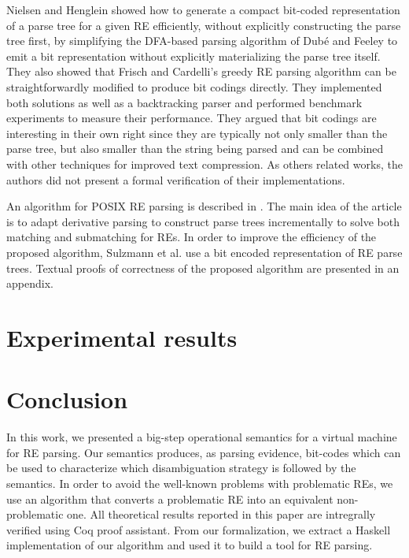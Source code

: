 Nielsen and Henglein \cite{Lasse2011} showed how to generate a compact bit-coded representation of a parse tree for a
given RE efficiently, without explicitly constructing the parse tree first, by simplifying the DFA-based parsing algorithm of
Dubé and Feeley \cite{Dube2000} to emit a bit representation without explicitly materializing the parse tree itself.
They also showed that Frisch and Cardelli’s greedy RE parsing algorithm \cite{Frisch2004} can be straightforwardly modified to
produce bit codings directly. They implemented both solutions as well as a backtracking parser and performed benchmark experiments
to measure their performance. They argued that bit codings are interesting in their own right since they are typically not
only smaller than the parse tree, but also smaller than the string being parsed and can be combined with other techniques for
improved text compression. As others related works, the authors did not present a formal verification of their implementations.


An algorithm for POSIX RE parsing is described in \cite{Sulzmann14}. The main idea of the article is to adapt
derivative parsing to construct parse trees incrementally to solve both matching and submatching for REs. In order to improve the
efficiency of the proposed algorithm, Sulzmann et al. use a bit encoded representation of RE parse trees. Textual proofs of
correctness of the proposed algorithm are presented in an appendix.


\section{Experimental results}


\label{section:experiments}


\section{Conclusion}


\label{section:conclusion}


In this work, we presented a big-step operational semantics for a virtual machine for RE parsing. 
Our semantics produces, as parsing evidence, bit-codes which can be used to characterize which
disambiguation strategy is followed by the semantics. In order to avoid the well-known problems with 
problematic REs, we use an algorithm that converts a problematic RE into an equivalent non-problematic one.
All theoretical results reported in this paper are intregrally verified using Coq proof assistant.
From our formalization, we extract a Haskell implementation of our algorithm and used it to build 
a tool for RE parsing.
\begin{coqdoccode}
\end{coqdoccode}
